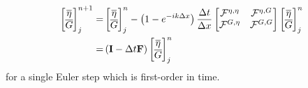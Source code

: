 \begin{align}
\label{eqn:singleEvolveStep}
\begin{bmatrix}
\overline{\eta} \\ \overline{G}
\end{bmatrix}^{n+1}_j =& \begin{bmatrix}
\overline{\eta} \\ \overline{G}
\end{bmatrix}^{n}_j - \left(1 - e^{-ik\Delta x}\right)\frac{\Delta t}{ \Delta x}\begin{bmatrix}
\mathcal{F}^{\eta,\eta} & \mathcal{F}^{\eta,G} \\\mathcal{F}^{G,\eta} &\mathcal{F}^{G,G}
\end{bmatrix}\begin{bmatrix}
\overline{\eta} \\ \overline{G}
\end{bmatrix}^{n}_j \nonumber\\=& \left(\mathbf{I}  - \Delta t \mathbf{F} \right) \begin{bmatrix}
\overline{\eta} \\ \overline{G} 
\end{bmatrix}^{n}_j
\end{align}
for a single Euler step which is first-order in time. 

